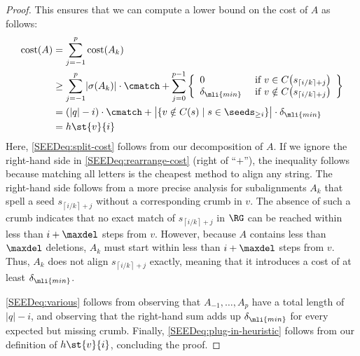 \begin{proof}
	This ensures that we can compute a lower bound on the cost of $A$ as
	follows:
	\begin{align}
		\text{cost}(A) 
		&= \sum_{j=-1}^{p} \text{cost}(A_k) \label{SEEDeq:split-cost} \\
		&\geq \sum_{j=-1}^{p} \lvert \sigma(A_k) \rvert \cdot \cmatch + \sum_{j=0}^{p-1} \left\{ \begin{array}{ll}
			0 & \text{ if } v \in C\!\left(s_{\left\lceil i/k \right\rceil + j}\right) \\
			\delta_\mli{min} & \text{ if } v \notin C\!\left(s_{\left\lceil i/k \right\rceil + j}\right)
		\end{array}\right\} \label{SEEDeq:rearrange-cost} \\
		&= (\lvert q \rvert - i) \cdot \cmatch + \big\lvert \{v \notin C(s) \mid s \in \seeds_{\geq i}\} \big\rvert \cdot \delta_\mli{min} \label{SEEDeq:various} \\
		&= h\st{v}{i} \label{SEEDeq:plug-in-heuristic}
	\end{align}
	Here, \cref{SEEDeq:split-cost} follows from our decomposition of $A$. If we
	ignore the right-hand side in \cref{SEEDeq:rearrange-cost} (right of ``$+$''),
	the inequality follows because matching all letters is the cheapest method
	to align any string. The right-hand side follows from a more precise
	analysis for subalignments $A_k$ that spell a seed $s_{\left\lceil i/k
	\right\rceil + j}$ without a corresponding crumb in $v$. The absence of such
	a crumb indicates that no exact match of $s_{\left\lceil i/k \right\rceil +
	j}$ in $\RG$ can be reached within less than $i + \maxdel$ steps from $v$.
	However, because $A$ contains less than $\maxdel$ deletions, $A_k$ must
	start within less than $i + \maxdel$ steps from $v$. Thus, $A_k$ does not
	align $s_{\left\lceil i/k \right\rceil + j}$ exactly, meaning that it
	introduces a cost of at least $\delta_\mli{min}$.

	\cref{SEEDeq:various} follows from observing that $A_{-1}, \dots, A_p$ have a
	total length of $|q|-i$, and observing that the right-hand sum adds up
	$\delta_{\mli{min}}$ for every expected but missing crumb.
	Finally, \cref{SEEDeq:plug-in-heuristic} follows from our definition of
	$h\st{v}{i}$, concluding the proof.
\end{proof}
